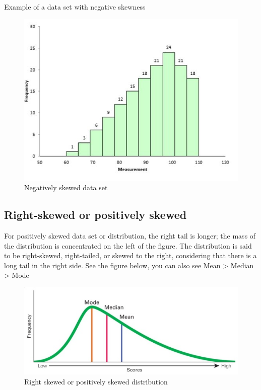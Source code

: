 \documentclass[
]{book}
\begin{document}
Example of a data set with negative skewness

\begin{figure}

{\centering \includegraphics[width=0.7\linewidth]{images/image6_5} 

}

\caption{Negatively skewed data set}\label{fig:sk3}
\end{figure}

\subsection{Right-skewed or positively skewed}\label{right-skewed-or-positively-skewed}

For positively skewed data set or distribution, the right tail is longer; the mass of the distribution is concentrated on the left of the figure. The distribution is said to be right-skewed, right-tailed, or skewed to the right, considering that there is a long tail in the right side. See the figure below, you can also see Mean \textgreater{} Median \textgreater{} Mode

\begin{figure}

{\centering \includegraphics[width=0.7\linewidth]{images/image7_5} 

}

\caption{Right skewed or positively skewed distribution}\label{fig:sk4}
\end{figure}
\end{document}
